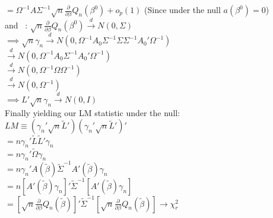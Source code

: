 \documentclass[11pt]{article}
\theoremstyle{definition}
\newcommand*\circled[1]{\tikz[baseline=(char.base)]{
            \node[shape=circle,draw,inner sep=2pt] (char) {#1};}}
\def\indist{\stackrel{d}{\rightarrow}}
\begin{document}
\hspace{10.5mm}$=\Omega^{-1}A\Sigma^{-1}\sqrt{n}\frac{\partial}{\partial \beta} Q_{n}(\beta^{0})+o_{p}(1)$ (Since under the null $a(\beta^{0})=0$)\\

and \circled{B} \ : $ \sqrt{n}\frac{\partial}{\partial \beta}Q_{n}(\beta^{0}) \indist N(0,\Sigma)$ \\

$\implies \sqrt{n}\gamma_{n} \indist N(0,\Omega^{-1}A_{0}\Sigma^{-1}\Sigma \Sigma^{-1}A_{0}'\Omega^{-1})$ \\

\hspace{20mm}$\indist N(0,\Omega^{-1}A_{0} \Sigma^{-1}A_{0}'\Omega^{-1})$ \\

\hspace{20mm}$\indist N(0,\Omega^{-1}\Omega\Omega^{-1})$ \\

\hspace{20mm}$\indist N(0,\Omega^{-1})$ \\

$\implies L'\sqrt{n}\gamma_{n} \indist N(0,I)$ \\

Finally yielding our LM statistic under the null:\\

$LM \equiv \left(\gamma_{n}'\sqrt{n}\tilde{L}'\right)\left(\gamma_{n}'\sqrt{n}\tilde{L}'\right)'$\\

\hspace{7.5mm}$=n\gamma_{n}'\tilde{L}\tilde{L}'\gamma_{n}$ \\

\hspace{7.5mm}$=n\gamma_{n}'\tilde{\Omega}\gamma_{n}$ \\

\hspace{7.5mm}$=n\gamma_{n}'A(\tilde{\beta})\tilde{\Sigma}^{-1}A'(\tilde{\beta})\gamma_{n}$ \\

\hspace{7.5mm}$=n\left[A'(\tilde{\beta})\gamma_{n}\right]'\tilde{\Sigma}^{-1}\left[A'(\tilde{\beta})\gamma_{n}\right]$ \\

\hspace{7.5mm}$=\left[\sqrt{n}\frac{\partial}{\partial \beta}Q_{n}(\tilde{\beta})\right]'\tilde{\Sigma}^{-1}\left[\sqrt{n}\frac{\partial}{\partial \beta}Q_{n}(\tilde{\beta})\right] \rightarrow \chi_{r}^{2}$ \\
\end{document}
